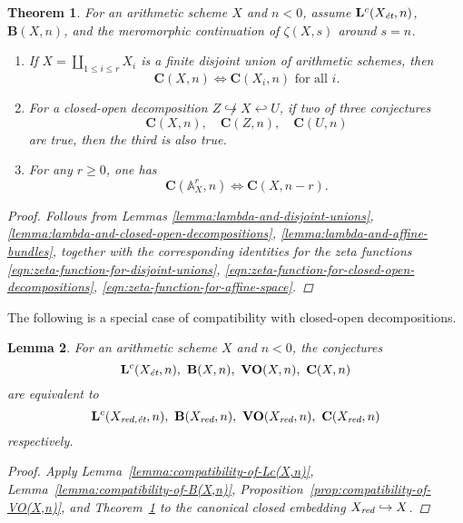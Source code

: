 \documentclass[10pt,a4paper,oneside,draft]{article}
\renewcommand{\AA}{\mathbb{A}}
\newcommand{\et}{\text{\it \'{e}t}}
\newcommand{\red}{\text{\it red}}
\theoremstyle{myplain}
\newtheorem{theorem}{Theorem}[section]
\newtheorem{lemma}[theorem]{Lemma}
\theoremstyle{mydefinition}
\numberwithin{equation}{section}
\begin{document}
\begin{theorem}
  \label{thm:compatibility-of-C(X,n)}
  For an arithmetic scheme $X$ and $n < 0$, assume $\mathbf{L}^c (X_\et,n)$,
  $\mathbf{B} (X,n)$, and the meromorphic continuation of $\zeta (X,s)$ around
  $s = n$.

  \begin{enumerate}
  \item[1)] If $X = \coprod_{1 \le i \le r} X_i$ is a finite disjoint union of
    arithmetic schemes, then
    $$\mathbf{C} (X,n) \iff \mathbf{C} (X_i,n)\text{ for all }i.$$

  \item[2)] For a closed-open decomposition
    $Z \not\hookrightarrow X \hookleftarrow U$, if two of three conjectures
    \[ \mathbf{C} (X,n), \quad
      \mathbf{C} (Z,n), \quad
      \mathbf{C} (U,n) \]
    are true, then the third is also true.

  \item[3)] For any $r \ge 0$, one has
    $$\mathbf{C} (\AA^r_X, n) \iff \mathbf{C} (X, n-r).$$
  \end{enumerate}

  \begin{proof}
    Follows from Lemmas
    \ref{lemma:lambda-and-disjoint-unions},
    \ref{lemma:lambda-and-closed-open-decompositions},
    \ref{lemma:lambda-and-affine-bundles},
    together with the corresponding identities for the zeta functions
    \eqref{eqn:zeta-function-for-disjoint-unions},
    \eqref{eqn:zeta-function-for-closed-open-decompositions},
    \eqref{eqn:zeta-function-for-affine-space}.
  \end{proof}
\end{theorem}

The following is a special case of compatibility with closed-open
decompositions.

\begin{lemma}
  \label{lemma:compatibility-for-Xred}
  For an arithmetic scheme $X$ and $n < 0$, the conjectures
  \[
    \mathbf{L}^c (X_\et,n), ~
    \mathbf{B} (X,n), ~
    \mathbf{VO} (X,n), ~
    \mathbf{C} (X,n)
  \]
  are equivalent to
  \[
    \mathbf{L}^c (X_\text{\it red,\'{e}t},n), ~
    \mathbf{B} (X_\red,n), ~
    \mathbf{VO} (X_\red,n), ~
    \mathbf{C} (X_\red,n)
  \]
  respectively.

  \begin{proof}
    Apply Lemma~\ref{lemma:compatibility-of-Lc(X,n)},
    Lemma~\ref{lemma:compatibility-of-B(X,n)},
    Proposition~\ref{prop:compatibility-of-VO(X,n)}, and
    Theorem~\ref{thm:compatibility-of-C(X,n)} to the canonical closed embedding
    $X_\red \hookrightarrow X$.
  \end{proof}
\end{lemma}
\end{document}
